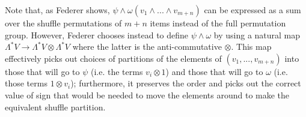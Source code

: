 Note that, as Federer shows, \(\psi \wedge \omega \left(v_1 \wedge ... \wedge v_{m+n}\right)\) can be expressed as a sum over the shuffle permutations of \(m+n\) items instead of the full
permutation group. However, Federer chooses instead to define \(\psi \wedge \omega\) by using a natural map \(\Lambda^* V \to \Lambda^* V \otimes \Lambda^* V\) where the latter is the
anti-commutative \(\otimes\). This map effectively
picks out choices of partitions of the elements of \((v_1, ..., v_{m+n})\) into those that will go to \(\psi\) (i.e. the terms \(v_i \otimes 1\)) and those that will go to \(\omega\)
 (i.e. those terms \(1 \otimes v_i\)); furthermore, it preserves the order and
picks out the correct value of sign that would be needed to move the elements around to make the equivalent shuffle partition.
